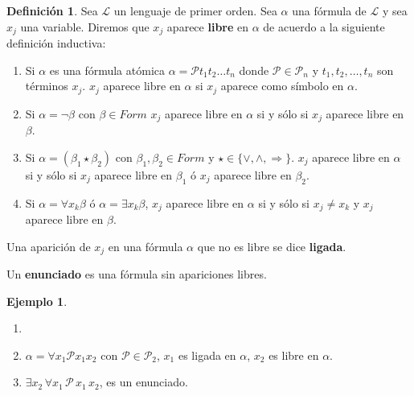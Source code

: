 \documentclass[a4paper,11pt]{article}
\theoremstyle{definition}
\newtheorem{defn}{Definición}[section]
\newtheorem{exap}{Ejemplo}[section]
\theoremstyle{remark}
\begin{document}
\begin{defn}
    Sea $\mathcal L$ un lenguaje de primer orden. Sea $\alpha$ una fórmula de $\mathcal L$ 
    y sea $x_j$ una variable. Diremos que $x_j$ aparece \textbf{libre} en $\alpha$ 
    de acuerdo a la siguiente definición inductiva:
    
    \begin{enumerate}
        \item Si $\alpha$ es una fórmula atómica $\alpha = \mathcal P t_1 t_2 \dots t_n$
        donde $\mathcal P \in \mathcal P_n$ y $t_1, t_2, \dots, t_n$ son términos $x_j$.
        $x_j$ aparece libre en $\alpha$ si $x_j$ aparece como símbolo en $\alpha$.
        
        \item Si $\alpha = \lnot\beta$ con $\beta \in Form$ $x_j$ aparece libre en $\alpha$ 
        si y sólo si $x_j$ aparece libre en $\beta$.
        
        \item Si $\alpha = (\beta_1 \star \beta_2)$ con $\beta_1, \beta_2 \in Form$ y 
        $\star \in \{\lor, \land, \Rightarrow\}$. $x_j$ aparece libre en $\alpha$
        si y sólo si $x_j$ aparece libre en $\beta_1$ ó $x_j$ aparece libre en $\beta_2$.
        
        \item Si $\alpha = \forall x_k \beta$ ó $\alpha = \exists x_k \beta$, $x_j$
        aparece libre en $\alpha$ si y sólo si $x_j \neq x_k$ y $x_j$ aparece libre en $\beta$.
    \end{enumerate}
    
    Una aparición de $x_j$ en una fórmula $\alpha$ que no es libre se dice \textbf{ligada}.
    
    Un \textbf{enunciado} es una fórmula sin apariciones libres.
\end{defn}

\begin{exap}
    \begin{enumerate}
        \item[]
        
        \item $\alpha = \forall x_1 \mathcal P x_1 x _2$ con $\mathcal P \in \mathcal P_2$,
        $x_1$ es ligada en $\alpha$, $x_2$ es libre en $\alpha$.
        
        \item $\exists x_2\,\forall x_1\,\mathcal P\,x_1\,x_2$, es un enunciado.
    \end{enumerate}
\end{exap}
\end{document}
